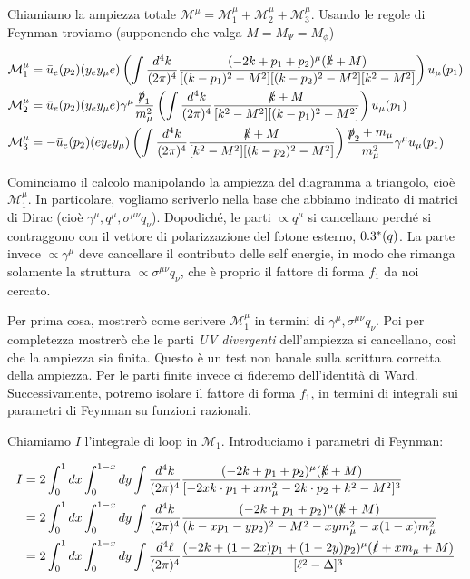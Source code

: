 \documentclass[11pt]{report}
\begin{document}
Chiamiamo la ampiezza totale \(\mathcal{M}^\mu = \mathcal{M}^\mu_1 +\mathcal{M}^\mu_2 + \mathcal{M}^\mu_3\). Usando le regole di Feynman troviamo (supponendo che valga \(M = M_\Psi = M_\phi\))

\begin{align}
    &\mathcal{M}^\mu_1 = \bar{u}_e(p_2)(y_ey_\mu e) \left(\int \frac{d^4k}{(2\pi)^4}\frac{(-2k + p_1 + p_2)^\mu (\slashed{k}+M)}{[(k-p_1)^2 - M^2][(k-p_2)^2 - M^2][k^2 - M^2]}\right) u_\mu (p_1) \notag \\
    &\mathcal{M}^\mu_2 = \bar{u}_e(p_2)(y_e y_\mu e)\gamma^\mu \frac{\slashed{p}_1}{m^2_\mu}\left(\int \frac{d^4k}{(2\pi)^4}\frac{\slashed{k}+M}{[k^2-M^2][(k-p_1)^2 - M^2]} \right)u_\mu (p_1) \notag \\
    &\mathcal{M}^\mu_3 = -\bar{u}_e(p_2)(ey_e y_\mu)\left(\int \frac{d^4k}{(2\pi)^4}\frac{\slashed{k} + M}{[k^2 - M^2][(k-p_2)^2 - M^2]} \right)\frac{\slashed{p}_2 + m_\mu}{m_\mu^2}\gamma^\mu u_\mu (p_1)
\end{align}

Cominciamo il calcolo manipolando la ampiezza del diagramma a triangolo, cioè \(\mathcal{M}_1^\mu\). In particolare, vogliamo scriverlo nella base che abbiamo indicato di matrici di Dirac (cioè \(\gamma^\mu, q^\mu, \sigma^{\mu\nu}q_\nu\)). Dopodiché, le parti \(\propto q^\mu\) si cancellano perché si contraggono con il vettore di polarizzazione del fotone esterno, \(0.3^*(q)\). La parte invece \(\propto \gamma^\mu\) deve cancellare il contributo delle self energie, in modo che rimanga solamente la struttura \(\propto \sigma^{\mu\nu}q_\nu\), che è proprio il fattore di forma \(f_1\) da noi cercato. 

Per prima cosa, mostrerò come scrivere \(\mathcal{M}_1^\mu\) in termini di \(\gamma^\mu, \sigma^{\mu\nu}q_\nu\). Poi per completezza mostrerò che le parti \emph{UV divergenti} dell'ampiezza si cancellano, così che la ampiezza sia finita. Questo è un test non banale sulla scrittura corretta della ampiezza. Per le parti finite invece ci fideremo dell'identità di Ward. Successivamente, potremo isolare il fattore di forma \(f_1\), in termini di integrali sui parametri di Feynman su funzioni razionali. 

Chiamiamo \(I\) l'integrale di loop in \(\mathcal{M}_1\). Introduciamo i parametri di Feynman: 

\begin{align}
    I &= 2\int_0^1 dx \int_0^{1-x}dy \int \frac{d^4k}{(2\pi)^4}\frac{(-2k + p_1 + p_2)^\mu (\slashed{k}+M)}{[-2xk\cdot p_1 +xm_\mu^2 -2k\cdot p_2 +k^2 -M^2]^3} \notag \\
    &= 2\int_0^1 dx \int_0^{1-x}dy \int \frac{d^4k}{(2\pi)^4}\frac{(-2k + p_1 + p_2)^\mu (\slashed{k}+M)}{(k-xp_1 -yp_2)^2 -M^2 -xym_\mu^2 -x(1-x)m^2_\mu} \notag \\ 
    &= 2 \int_0^1 dx \int_0^{1-x}dy \int \frac{d^4\ell}{(2\pi)^4}\frac{(-2k + (1-2x)p_1 + (1-2y)p_2)^\mu (\slashed{\ell} + xm_\mu + M)}{[\ell^2 - \Delta]^3}
\end{align}
\end{document}
